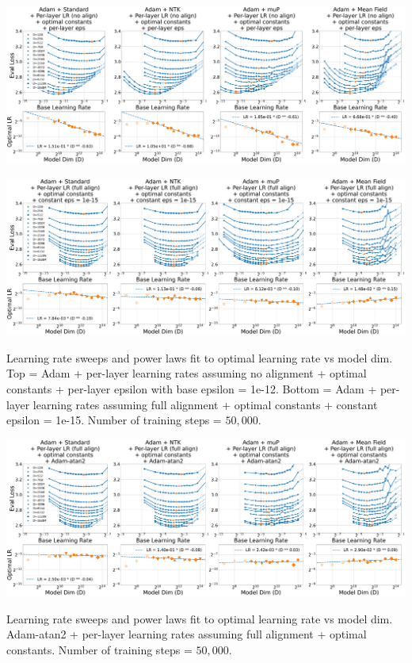 \documentclass{article}
\theoremstyle{plain}
\theoremstyle{definition}
\theoremstyle{remark}
\begin{document}
\thispagestyle{plain}
\begin{SidewaysFigure}
\includegraphics[width=\linewidth]{icml2024/figures/lr_sweeps/appendix/adam/adam+50k_steps_per_module_lr_no_align_optimal_constants_per_module_eps_base_eps12.pdf}

\figvspace

\includegraphics[width=\linewidth]{icml2024/figures/lr_sweeps/appendix/adam/adam+50k_steps_per_module_lr_optimal_constants_eps15.pdf}
\caption{Learning rate sweeps and power laws fit to optimal learning rate vs model dim. Top = Adam + per-layer learning rates assuming no alignment + optimal constants + per-layer epsilon with base epsilon = 1e-12. Bottom = Adam + per-layer learning rates assuming full alignment + optimal constants + constant epsilon = 1e-15. Number of training steps = $50{,}000$.}
\end{SidewaysFigure}
\clearpage

\thispagestyle{plain}
\begin{SidewaysFigure}
\includegraphics[width=\linewidth]{icml2024/figures/lr_sweeps/appendix/adam/adam+50k_steps_per_module_lr_optimal_constants_atan2_scale1.pdf}
\caption{Learning rate sweeps and power laws fit to optimal learning rate vs model dim. Adam-atan2 + per-layer learning rates assuming full alignment + optimal constants. Number of training steps = $50{,}000$.}
\end{SidewaysFigure}
\clearpage
\end{document}

